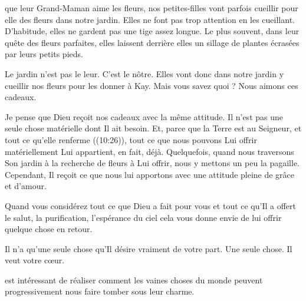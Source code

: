  que leur Grand-Maman aime les fleurs, nos petites-filles
 vont parfois cueillir pour elle des fleurs dans notre jardin.
 Elles ne font pas trop attention en les cueillant.
 D'habitude, elles ne gardent pas une tige assez longue.
 Le plus souvent, dans leur quête des fleurs parfaites, elles laissent derrière
 elles un sillage de plantes écrasées par leurs petits pieds.

Le jardin n'est pas le leur. C'est le nôtre. Elles vont donc dans notre jardin
 y cueillir nos fleurs pour les donner à Kay.
 Mais vous savez quoi ? Nous aimons ces cadeaux.

Je pense que Dieu reçoit nos cadeaux avec la même attitude.
 Il n'est pas une seule chose matérielle dont Il ait besoin.
 Et, parce que \og la Terre est au Seigneur, et tout ce qu'elle renferme \fg{}
 ((10:26)), tout ce que nous pouvons Lui offrir matériellement
 Lui appartient, en fait, déjà. Quelquefois, quand nous traversons Son jardin
 à la recherche de fleurs à Lui offrir, nous y mettons un peu la pagaille.
 Cependant, Il reçoit ce que nous lui apportons avec une attitude
 pleine de grâce et d'amour.

Quand vous considérez tout ce que Dieu a fait pour vous
 et tout ce qu'Il a offert \ocadr le salut, la purification,
 l'espérance du ciel \fcadr{} cela vous donne envie de lui offrir
 quelque chose en retour.


Il n'a qu'une seule chose qu'Il désire vraiment de votre part.
 Une seule chose. Il veut votre c\oe{}ur. 

\dvrule







 est intéressant de réaliser comment les vaines choses
 du monde peuvent progressivement nous faire tomber sous leur charme.

